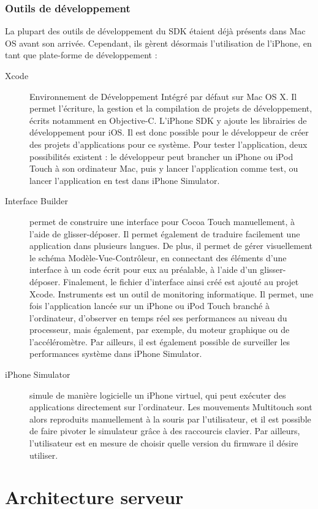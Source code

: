 \documentclass[a4paper,12pt]{report}
\begin{document}
\begin{onehalfspace}
\subsection{Outils de développement}
La plupart des outils de développement du SDK étaient déjà présents dans Mac OS avant son arrivée. Cependant, ils gèrent désormais l'utilisation de l'iPhone, en tant que plate-forme de développement :
\begin{description}
\item[Xcode] Environnement de Développement Intégré par défaut sur Mac OS X. Il permet l'écriture, la gestion et la compilation de projets de développement, écrits notamment en Objective-C. L'iPhone SDK y ajoute les librairies de développement pour iOS. Il est donc possible pour le développeur de créer des projets d'applications pour ce système. Pour tester l'application, deux possibilités existent : le développeur peut brancher un iPhone ou iPod Touch à son ordinateur Mac, puis y lancer l'application comme test, ou lancer l'application en test dans iPhone Simulator.
\item[Interface Builder] permet de construire une interface pour Cocoa Touch manuellement, à l'aide de glisser-déposer. Il permet également de traduire facilement une application dans plusieurs langues. De plus, il permet de gérer visuellement le schéma Modèle-Vue-Contrôleur, en connectant des éléments d'une interface à un code écrit pour eux au préalable, à l'aide d'un glisser-déposer. Finalement, le fichier d'interface ainsi créé est ajouté au projet Xcode.
Instruments est un outil de monitoring informatique. Il permet, une fois l'application lancée sur un iPhone ou iPod Touch branché à l'ordinateur, d'observer en temps réel ses performances au niveau du processeur, mais également, par exemple, du moteur graphique ou de l'accéléromètre. Par ailleurs, il est également possible de surveiller les performances système dans iPhone Simulator.
\item[iPhone Simulator] simule de manière logicielle un iPhone virtuel, qui peut exécuter des applications directement sur l'ordinateur. Les mouvements Multitouch sont alors reproduits manuellement à la souris par l'utilisateur, et il est possible de faire pivoter le simulateur grâce à des raccourcis clavier. Par ailleurs, l'utilisateur est en mesure de choisir quelle version du firmware il désire utiliser.
\end{description}

\chapter{Architecture serveur}


\end{onehalfspace}
\end{document}
